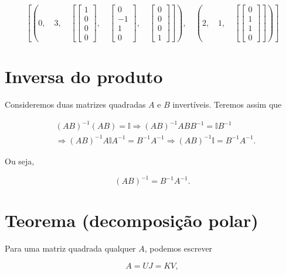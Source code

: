 \documentclass[11pt]{article}
\begin{document}
    $$\left [ \left ( 0, \quad 3, \quad \left [ \left[\begin{matrix}1\\0\\0\\0\end{matrix}\right], \quad \left[\begin{matrix}0\\-1\\1\\0\end{matrix}\right], \quad \left[\begin{matrix}0\\0\\0\\1\end{matrix}\right]\right ]\right ), \quad \left ( 2, \quad 1, \quad \left [ \left[\begin{matrix}0\\1\\1\\0\end{matrix}\right]\right ]\right )\right ]$$

    

    \section{Inversa do produto}\label{inversa-do-produto}

Consideremos duas matrizes quadradas \(A\) e \(B\) invertíveis. Teremos
assim que

\begin{align}
&(AB)^{-1}(AB)=\mathbb{I}\Rightarrow (AB)^{-1}ABB^{-1}=\mathbb{I}B^{-1} \\
&\Rightarrow (AB)^{-1}A\mathbb{I}A^{-1}=B^{-1}A^{-1}\Rightarrow (AB)^{-1}\mathbb{I}=B^{-1}A^{-1}.
\end{align}

Ou seja,

\begin{equation}
(AB)^{-1}=B^{-1}A^{-1}.
\end{equation}

    \section{Teorema (decomposição
polar)}\label{teorema-decomposiuxe7uxe3o-polar}

Para uma matriz quadrada qualquer \(A\), podemos escrever

\begin{equation}
A=UJ=KV,
\end{equation}
\end{document}
